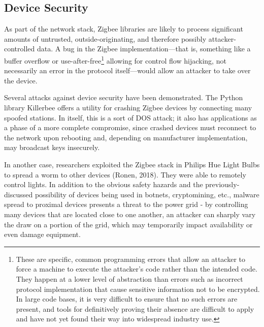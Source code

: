 \subsection{Device Security}
As part of the network stack, Zigbee libraries are likely to process significant amounts of untrusted, outside-originating, and therefore possibly attacker-controlled data. A bug in the Zigbee implementation---that is, something like a buffer overflow or use-after-free\footnote{These are specific, common programming errors that allow an attacker to force a machine to execute the attacker’s code rather than the intended code. They happen at a lower level of abstraction than errors such as incorrect protocol implementation that cause sensitive information not to be encrypted. In large code bases, it is very difficult to ensure that no such errors are present, and tools for definitively proving their absence are difficult to apply and have not yet found their way into widespread industry use.
} allowing for control flow hijacking, not necessarily an error in the protocol itself---would allow an attacker to take over the device.

Several attacks against device security have been demonstrated. The Python library Killerbee offers a utility for crashing Zigbee devices by connecting many spoofed stations. In itself, this is a sort of DOS attack; it also has applications as a phase of a more complete compromise, since crashed devices must reconnect to the network upon rebooting and, depending on manufacturer implementation, may broadcast keys insecurely.

In another case, researchers exploited the Zigbee stack in Philips Hue Light Bulbs to spread a worm to other devices (Ronen, 2018). They were able to remotely control lights. In addition to the obvious safety hazards and the previously-discussed possibility of devices being used in botnets, cryptomining, etc., malware spread to proximal devices presents a threat to the power grid - by controlling many devices that are located close to one another, an attacker can sharply vary the draw on a portion of the grid, which may temporarily impact availability or even damage equipment.

